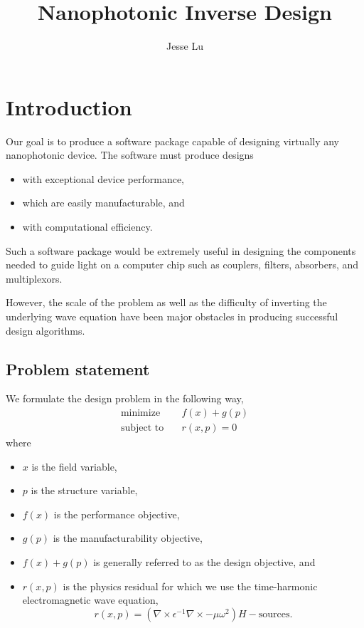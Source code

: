 \documentclass{article}
\title{Nanophotonic Inverse Design}
\author{Jesse Lu}
\begin{document}
\maketitle
\tableofcontents

\section{Introduction}
Our goal is to produce
    a software package capable of designing virtually any nanophotonic device.
The software must produce designs
    \begin{itemize}
    \item with exceptional device performance,
    \item which are easily manufacturable, and
    \item with computational efficiency.
    \end{itemize}

Such a software package would be extremely useful 
    in designing the components needed to guide light on a computer chip
    such as couplers, filters, absorbers, and multiplexors.

However, the scale of the problem as well as 
    the difficulty of inverting the underlying wave equation
    have been major obstacles in producing successful design algorithms.


\subsection{Problem statement}
We formulate the design problem in the following way,
    \begin{subequations}\begin{align}
    \text{minimize} \quad   & f(x) + g(p) \\
    \text{subject to} \quad & r(x, p) = 0
    \end{align}\label{prob stat}\end{subequations}
    where
    \begin{itemize}
    \item $x$ is the field variable,
    \item $p$ is the structure variable,
    \item $f(x)$ is the performance objective,
    \item $g(p)$ is the manufacturability objective,
    \item $f(x) + g(p)$ is generally referred to as the design objective, and
    \item $r(x,p)$ is the physics residual for which we use 
            the time-harmonic electromagnetic wave equation,
            \begin{equation}
            r(x,p) = 
                (\nabla \times \epsilon^{-1} \nabla \times - \mu \omega^2) H
                - \text{sources}.
            \end{equation}
    \end{itemize}
\end{document}
